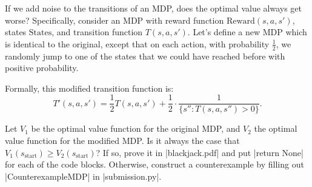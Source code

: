 \item {}
If we add noise to the transitions of an MDP, does the optimal value always get
worse? Specifically, consider an MDP with reward function $\text{Reward}
(s,a,s')$, states $\text{States}$, and transition function $T(s,a,s')$.  Let's
define a new MDP which is identical to the original, except that on each action,
with probability $\frac{1}{2}$, we randomly jump to one of the states that we
could have reached before with positive probability.

Formally, this modified transition function is:
\[T'(s,a,s')= \frac{1}{2} T(s,a,s') + \frac{1}{2} \cdot \frac{1}{\{ s'' : T(s, a, s'') > 0\}}.\]

Let $V_1$ be the optimal value function for the original MDP, and $V_2$ the
optimal value function for the modified MDP. Is it always the case that $V_1
(s_\text{start})\geq V_2(s_\text{start})$?  If so, prove it in |blackjack.pdf|
and put |return None| for each of the code blocks. Otherwise, construct a
counterexample by filling out |CounterexampleMDP| in |submission.py|.

